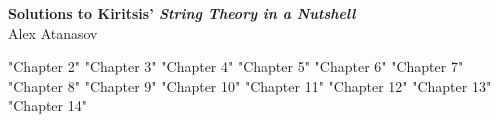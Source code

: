 \documentclass[11pt]{article}
\begin{document}
	\begin{center}
		\Large \textbf{Solutions to Kiritsis' \emph{String Theory in a Nutshell}}\\
		Alex Atanasov
	\end{center}
	
	{"Chapter 2"}
	\newpage 
	{"Chapter 3"}
	\newpage 
	{"Chapter 4"}
	\newpage 
	{"Chapter 5"}
	\newpage 
	{"Chapter 6"}
	\newpage 
	{"Chapter 7"}
	\newpage 
	{"Chapter 8"}
	\newpage 
	{"Chapter 9"}
	\newpage 
	{"Chapter 10"}
	\newpage 
	{"Chapter 11"}
	\newpage
	{"Chapter 12"}
	\newpage
	{"Chapter 13"}
	\newpage
	{"Chapter 14"}
\end{document}
